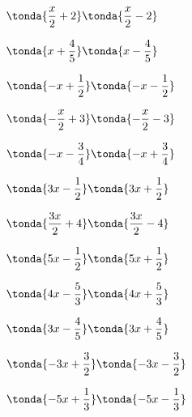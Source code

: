 \begin{esercizio}
\begin{htmulticols}{3}
\begin{enumeratea}
\item \(\tonda{\dfrac{x}{2} + 2}\tonda{\dfrac{x}{2} - 2}\) %
\item \(\tonda{x + \dfrac{4}{5}}\tonda{x - \dfrac{4}{5}}\) %
\item \(\tonda{- x + \dfrac{1}{2}}\tonda{- x - \dfrac{1}{2}}\) %
\item \(\tonda{- \dfrac{x}{2} + 3}\tonda{- \dfrac{x}{2} - 3}\) %
\item \(\tonda{- x - \dfrac{3}{4}}\tonda{- x + \dfrac{3}{4}}\) %
\item \(\tonda{3 x - \dfrac{1}{2}}\tonda{3 x + \dfrac{1}{2}}\) %
\item \(\tonda{\dfrac{3 x}{2} + 4}\tonda{\dfrac{3 x}{2} - 4}\) %
\item \(\tonda{5 x - \dfrac{1}{2}}\tonda{5 x + \dfrac{1}{2}}\) %
\item \(\tonda{4 x - \dfrac{5}{3}}\tonda{4 x + \dfrac{5}{3}}\) %
\item \(\tonda{3 x - \dfrac{4}{5}}\tonda{3 x + \dfrac{4}{5}}\) %
\item \(\tonda{- 3 x + \dfrac{3}{2}}\tonda{- 3 x - \dfrac{3}{2}}\) %
\item \(\tonda{- 5 x + \dfrac{1}{3}}\tonda{- 5 x - \dfrac{1}{3}}\) %

\end{enumeratea}
\end{htmulticols}
\end{esercizio}
